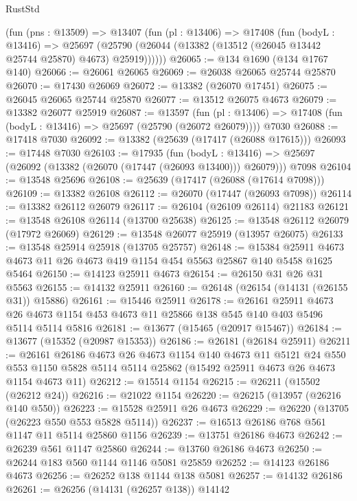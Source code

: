 \begin{lexlean}{RustStd}
\begin{coremodule}
    (fun (pns : @13509) =>
    @13407
      (fun (pl : @13406) =>
      @17408
        (fun (bodyL : @13416) =>
        @25697 (@25790 (@26044 (@13382 (@13512 (@26045 @13442 @25744 @25870) @4673) @25919))))))
@26065 := @134 @1690 (@134 @1767 @140)
@26066 := @26061 @26065
@26069 := @26038 @26065 @25744 @25870
@26070 := @17430 @26069
@26072 := @13382 (@26070 @17451)
@26075 := @26045 @26065 @25744 @25870
@26077 := @13512 @26075 @4673
@26079 := @13382 @26077 @25919
@26087 := @13597
    (fun (pl : @13406) => @17408 (fun (bodyL : @13416) => @25697 (@25790 (@26072 @26079))))
    @7030
@26088 := @17418 @7030
@26092 := @13382 (@25639 (@17417 (@26088 @17615)))
@26093 := @17448 @7030
@26103 := @17935
    (fun (bodyL : @13416) => @25697 (@26092 (@13382 (@26070 (@17447 (@26093 @13400))) @26079)))
    @7098
@26104 := @13548 @25696
@26108 := @25639 (@17417 (@26088 (@17614 @7098)))
@26109 := @13382 @26108
@26112 := @26070 (@17447 (@26093 @7098))
@26114 := @13382 @26112 @26079
@26117 := @26104 (@26109 @26114) @21183
@26121 := @13548 @26108 @26114 (@13700 @25638)
@26125 := @13548 @26112 @26079 (@17972 @26069)
@26129 := @13548 @26077 @25919 (@13957 @26075)
@26133 := @13548 @25914 @25918 (@13705 @25757)
@26148 := @15384
    @25911
    @4673
    @4673
    @11
    @26
    @4673
    @419
    @1154
    @454
    @5563
    @25867
    @140
    @5458
    @1625
    @5464
@26150 := @14123 @25911 @4673
@26154 := @26150 @31 @26 @31 @5563
@26155 := @14132 @25911
@26160 := @26148 (@26154 (@14131 (@26155 @31)) @15886)
@26161 := @15446 @25911
@26178 := @26161
    @25911
    @4673
    @26
    @4673
    @1154
    @453
    @4673
    @11
    @25866
    @138
    @545
    @140
    @403
    @5496
    @5114
    @5114
    @5816
@26181 := @13677 (@15465 (@20917 @15467))
@26184 := @13677 (@15352 (@20987 @15353))
@26186 := @26181 (@26184 @25911)
@26211 := @26161
    @26186
    @4673
    @26
    @4673
    @1154
    @140
    @4673
    @11
    @5121
    @24
    @550
    @553
    @1150
    @5828
    @5114
    @5114
    @25862
    (@15492 @25911 @4673 @26 @4673 @1154 @4673 @11)
@26212 := @15514 @1154
@26215 := @26211 (@15502 (@26212 @24))
@26216 := @21022 @1154
@26220 := @26215 (@13957 (@26216 @140 @550))
@26223 := @15528 @25911 @26 @4673
@26229 := @26220 (@13705 (@26223 @550 @553 @5828 @5114))
@26237 := @16513 @26186 @768 @561 @1147 @11 @5114 @25860 @1156
@26239 := @13751 @26186 @4673
@26242 := @26239 @561 @1147 @25860
@26244 := @13760 @26186 @4673
@26250 := @26244 @183 @560 @1144 @1146 @5081 @25859
@26252 := @14123 @26186 @4673
@26256 := @26252 @138 @1144 @138 @5081
@26257 := @14132 @26186
@26261 := @26256 (@14131 (@26257 @138)) @14142

\end{coremodule}
\end{lexlean}
